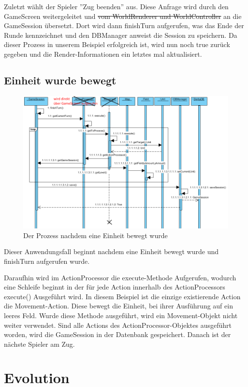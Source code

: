 \documentclass[fontsize=12pt,paper=a4,twoside]{scrartcl}
\begin{document}
Zuletzt wählt der Spieler ''Zug beenden'' aus. Diese Anfrage wird durch den GameScreen weitergeleitet und \sout{vom WorldRenderer und WorldController} an die GameSession übersetzt. Dort wird dann finishTurn aufgerufen, was das Ende der Runde kennzeichnet und den DBManager anweist die Session zu speichern. Da dieser Prozess in unserem Beispiel erfolgreich ist, wird nun noch true zurück gegeben und die Render-Informationen ein letztes mal aktualisiert.


\subsection{Einheit wurde bewegt}

\begin{figure}[h]
\centering
\includegraphics[width=1.0\linewidth]{sequenz2}
\caption{Der Prozess nachdem eine Einheit bewegt wurde}
\label{fig:sequenz2}
\end{figure}

Dieser Anwendungsfall beginnt nachdem eine Einheit bewegt wurde und finishTurn aufgerufen wurde. 

Daraufhin wird im ActionProcessor die execute-Methode Aufgerufen, wodurch eine Schleife beginnt in der für jede Action innerhalb des ActionProcessors execute() Ausgeführt wird. In diesem Beispiel ist die einzige existierende Action die Movement-Action. Diese bewegt die Einheit, bei ihrer Ausführung auf ein leeres Feld. Wurde diese Methode ausgeführt, wird ein Movement-Objekt nicht weiter verwendet. Sind alle Actions des ActionProcessor-Objektes ausgeführt worden, wird die GameSession in der Datenbank gespeichert. Danach ist der nächste Spieler am Zug.


\section{Evolution}
\end{document}
